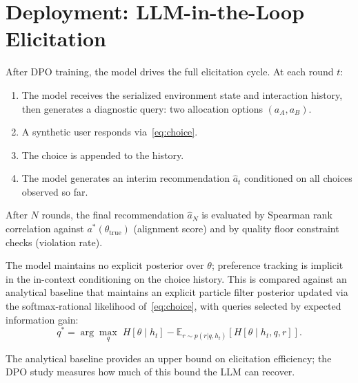 \documentclass[11pt]{article}
\begin{document}
\section{Deployment: LLM-in-the-Loop Elicitation}

After DPO training, the model drives the full elicitation cycle. At each
round $t$:

\begin{enumerate}
  \item The model receives the serialized environment state and interaction
    history, then generates a diagnostic query: two allocation options
    $(a_A, a_B)$.
  \item A synthetic user responds via~\eqref{eq:choice}.
  \item The choice is appended to the history.
  \item The model generates an interim recommendation $\hat{a}_t$
    conditioned on all choices observed so far.
\end{enumerate}

After $N$ rounds, the final recommendation $\hat{a}_N$ is evaluated by
Spearman rank correlation against $a^*(\theta_{\mathrm{true}})$ (alignment
score) and by quality floor constraint checks (violation rate).

The model maintains no explicit posterior over $\theta$; preference tracking
is implicit in the in-context conditioning on the choice history. This is
compared against an analytical baseline that maintains an explicit particle
filter posterior updated via the softmax-rational likelihood
of~\eqref{eq:choice}, with queries selected by expected information gain:
\begin{equation}\label{eq:eig}
  q^* = \arg\max_q \;
  H[\theta \mid h_t]
  - \mathbb{E}_{r \sim p(r|q, h_t)}\!\left[
    H[\theta \mid h_t, q, r]
  \right].
\end{equation}

The analytical baseline provides an upper bound on elicitation efficiency;
the DPO study measures how much of this bound the LLM can recover.
\end{document}
